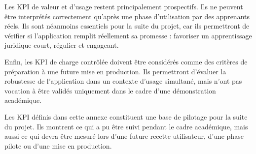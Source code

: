 Les KPI de valeur et d'usage restent principalement prospectifs. 
Ils ne peuvent être interprétés correctement qu'après une phase d'utilisation par des apprenants réels. 
Ils sont néanmoins essentiels pour la suite du projet, car ils permettront de vérifier si l'application remplit réellement sa promesse : favoriser un apprentissage juridique court, régulier et engageant.

Enfin, les KPI de charge contrôlée doivent être considérés comme des critères de préparation à une future mise en production. 
Ils permettront d'évaluer la robustesse de l'application dans un contexte d'usage simultané, mais n'ont pas vocation à être validés uniquement dans le cadre d'une démonstration académique.

\begin{tcolorbox}[
  colback=blue!5,
  colframe=blue!70!black,
  title={\textbf{Lecture globale des KPI}},
  boxrule=0.7pt,
  enhanced,
  sharp corners,
  breakable
]
Les KPI définis dans cette annexe constituent une base de pilotage pour la suite du projet. 
Ils montrent ce qui a pu être suivi pendant le cadre académique, mais aussi ce qui devra être mesuré lors d'une future recette utilisateur, d'une phase pilote ou d'une mise en production.
\end{tcolorbox}